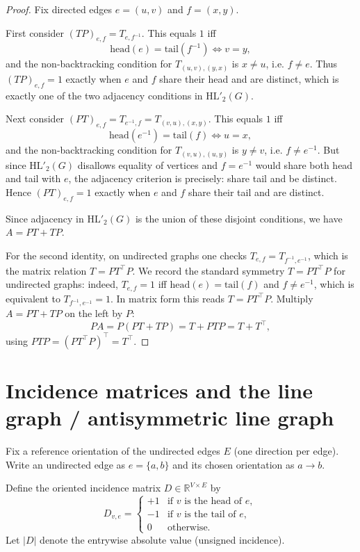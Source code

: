 \documentclass[11pt]{article}
\begin{document}
\begin{proof}
Fix directed edges $e=(u,v)$ and $f=(x,y)$.

First consider $(TP)_{e,f}=T_{e,f^{-1}}$. This equals $1$ iff
\[
\text{head}(e)=\text{tail}(f^{-1}) \iff v = y,
\]
and the non-backtracking condition for $T_{(u,v),(y,x)}$ is $x\neq u$, i.e. $f\neq e$. Thus $(TP)_{e,f}=1$ exactly when $e$ and $f$ share their head and are distinct, which is exactly one of the two adjacency conditions in $\mathrm{HL}'_2(G)$.

Next consider $(PT)_{e,f}=T_{e^{-1},f}=T_{(v,u),(x,y)}$. This equals $1$ iff
\[
\text{head}(e^{-1})=\text{tail}(f)\iff u=x,
\]
and the non-backtracking condition for $T_{(v,u),(u,y)}$ is $y\neq v$, i.e. $f\neq e^{-1}$. But since $\mathrm{HL}'_2(G)$ disallows equality of vertices and $f=e^{-1}$ would share both head and tail with $e$, the adjacency criterion is precisely: share tail and be distinct. Hence $(PT)_{e,f}=1$ exactly when $e$ and $f$ share their tail and are distinct.

Since adjacency in $\mathrm{HL}'_2(G)$ is the union of these disjoint conditions, we have $A=PT+TP$.

For the second identity, on undirected graphs one checks $T_{e,f}=T_{f^{-1},e^{-1}}$, which is the matrix relation $T=PT^\top P$. We record the standard symmetry $T = PT^\top P$ for undirected graphs: indeed,
$T_{e,f}=1$ iff $\mathrm{head}(e)=\mathrm{tail}(f)$ and $f\neq e^{-1}$, which is equivalent to
$T_{f^{-1},e^{-1}}=1$. In matrix form this reads $T = PT^\top P$. Multiply $A=PT+TP$ on the left by $P$:
\[
PA = P(PT+TP) = T + PTP = T + T^\top,
\]
using $PTP = (PT^\top P)^\top = T^\top$.  \end{proof}

\section{Incidence matrices and the line graph / antisymmetric line graph}

Fix a reference orientation of the undirected edges $E$ (one direction per edge). Write an undirected edge as $e=\{a,b\}$ and its chosen orientation as $a\to b$.

Define the oriented incidence matrix $D\in\mathbb R^{V\times E}$ by
\[
D_{v,e}=
\begin{cases}
+1 &\text{if } v \text{ is the head of } e,\\
-1 &\text{if } v \text{ is the tail of } e,\\
0 &\text{otherwise.}
\end{cases}
\]
Let $|D|$ denote the entrywise absolute value (unsigned incidence).
\end{document}

